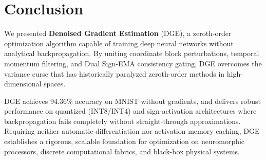 \documentclass[11pt,a4paper]{article}
\begin{document}
\section{Conclusion}
\label{sec:conclusion}

We presented \textbf{Denoised Gradient Estimation} (DGE), a zeroth-order optimization algorithm capable of training deep neural networks without analytical backpropagation. By uniting coordinate block perturbations, temporal momentum filtering, and Dual Sign-EMA consistency gating, DGE overcomes the variance curse that has historically paralyzed zeroth-order methods in high-dimensional spaces.

DGE achieves 94.36\% accuracy on MNIST without gradients, and delivers robust performance on quantized (INT8/INT4) and sign-activation architectures where backpropagation fails completely without straight-through approximations. Requiring neither automatic differentiation nor activation memory caching, DGE establishes a rigorous, scalable foundation for optimization on neuromorphic processors, discrete computational fabrics, and black-box physical systems.



\end{document}
